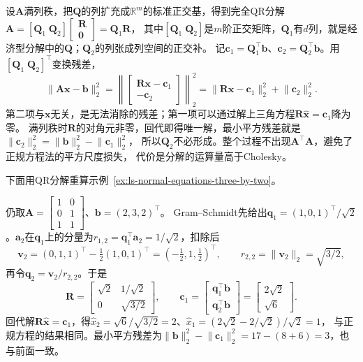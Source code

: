 设$\bm A$满列秩，把$\bm Q$的列扩充成$\mathbb R^m$的标准正交基，得到完全QR分解
$\bm A=[\bm Q_1\;\bm Q_2]\left[\begin{smallmatrix}\bm R\\\bm0\end{smallmatrix}\right]=\bm Q_1\bm R$，
其中$[\bm Q_1\;\bm Q_2]$是$m$阶正交矩阵，$\bm Q_1$有$d$列，就是经济型分解中的$\bm Q$；$\bm Q_2$的列张成列空间的正交补。
记$\bm c_1=\bm Q_1^\top\bm b$、$\bm c_2=\bm Q_2^\top\bm b$。用$[\bm Q_1\;\bm Q_2]^\top$变换残差，
\[
 \lVert\bm A\bm x-\bm b\rVert_2^2
 =\left\lVert\begin{bmatrix}\bm R\bm x-\bm c_1\\-\bm c_2\end{bmatrix}\right\rVert_2^2
 =\lVert\bm R\bm x-\bm c_1\rVert_2^2+\lVert\bm c_2\rVert_2^2 .
\]
第二项与$\bm x$无关，是无法消除的残差；第一项可以通过解上三角方程$\bm R\hat{\bm x}=\bm c_1$降为零。
满列秩时$\bm R$的对角元非零，回代即得唯一解，最小平方残差就是$\lVert\bm c_2\rVert_2^2=\lVert\bm b\rVert_2^2-\lVert\bm c_1\rVert_2^2$，
所以$\bm Q_2$不必形成。整个过程不出现$\bm A^\top\bm A$，避免了正规方程法的平方尺度损失，
代价是分解的运算量高于Cholesky。

下面用QR分解重算示例~\ref{ex:ls-normal-equations-three-by-two}。

\begin{example}[用QR分解求解最小二乘]
\label{ex:ls-qr-three-by-two}
仍取$\bm A=\left[\begin{smallmatrix}1&0\\0&1\\1&1\end{smallmatrix}\right]$、$\bm b=(2,3,2)^\top$。
Gram--Schmidt先给出$\bm q_1=(1,0,1)^\top/\sqrt2$。$\bm a_2$在$\bm q_1$上的分量为$r_{1,2}=\bm q_1^\top\bm a_2=1/\sqrt2$，扣除后
\[
 \bm v_2=(0,1,1)^\top-\tfrac12(1,0,1)^\top=(-\tfrac12,1,\tfrac12)^\top,\qquad
 r_{2,2}=\lVert\bm v_2\rVert_2=\sqrt{3/2},
\]
再令$\bm q_2=\bm v_2/r_{2,2}$。于是
\[
 \bm R=\begin{bmatrix}\sqrt2&1/\sqrt2\\0&\sqrt{3/2}\end{bmatrix},\qquad
 \bm c_1=\begin{bmatrix}\bm q_1^\top\bm b\\\bm q_2^\top\bm b\end{bmatrix}=\begin{bmatrix}2\sqrt2\\\sqrt6\end{bmatrix}.
\]
回代解$\bm R\hat{\bm x}=\bm c_1$，得$\hat x_2=\sqrt6/\sqrt{3/2}=2$、$\hat x_1=(2\sqrt2-2/\sqrt2)/\sqrt2=1$，
与正规方程的结果相同。最小平方残差为$\lVert\bm b\rVert_2^2-\lVert\bm c_1\rVert_2^2=17-(8+6)=3$，也与前面一致。
\end{example}

